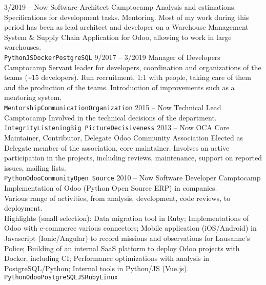 \documentclass[9pt]{developercv} %
\begin{document}
\begin{entrylist}
	\entry
		{3/2019 -- Now}
		{Software Architect}
		{Camptocamp}
		{Analysis and estimations. Specifications for development tasks. Mentoring.
      Most of my work during this period has been as lead architect and
      developer on a Warehouse Management System \& Supply Chain Application for
      Odoo, allowing to work in large warehouses.
      \\
      \texttt{Python}\slashsep\texttt{JS}\slashsep\texttt{Docker}\slashsep\texttt{PostgreSQL}}
	\entry
		{9/2017 -- 3/2019}
		{Manager of Developers}
		{Camptocamp}
		{Servant leader for developers, coordination and organizations of the teams
      (\textasciitilde{}15 developers). Run recruitment, 1:1 with people, taking
      care of them and the production of the teams. Introduction of improvements
      such as a mentoring system.
      \\
      \texttt{Mentorship}\slashsep\texttt{Communication}\slashsep\texttt{Organization}}
	\entry
		{2015 -- Now}
		{Technical Lead}
		{Camptocamp}
		{Involved in the technical decisions of the department.
      \\ \texttt{Integrity}\slashsep\texttt{Listening}\slashsep\texttt{Big Picture}\slashsep\texttt{Decisiveness}}
	\entry
		{2013 -- Now}
		{OCA Core Maintainer, Contributor, Delegate}
		{Odoo Community Association}
		{Elected as Delegate member of the association, core maintainer.
      Involves an active participation in the projects, including
      reviews, maintenance, support on reported issues, mailing lists. \\
      \texttt{Python}\slashsep\texttt{Odoo}\slashsep\texttt{Community}\slashsep\texttt{Open Source}}
	\entry
		{2010 -- Now}
		{Software Developer}
		{Camptocamp}
		{Implementation of Odoo (Python Open Source ERP) in companies.\\
      Various range of activities, from analysis, development, code reviews, to deployment.\\
      Highlights (small selection): 
      Data migration tool in Ruby; Implementations of Odoo with e-commerce
      various connectors; Mobile application (iOS/Android)
      in Javascript (Ionic/Angular) to record missions and observations for Lausanne's Police;
      Building of an internal SaaS platform to deploy Odoo projects with Docker, including CI;
      Performance optimizations with analysis in PostgreSQL/Python;
      Internal tools in Python/JS (Vue.js). \\
      \texttt{Python}\slashsep\texttt{Odoo}\slashsep\texttt{PostgreSQL}\slashsep\texttt{JS}\slashsep\texttt{Ruby}\slashsep\texttt{Linux}}

\end{entrylist}
\end{document}
